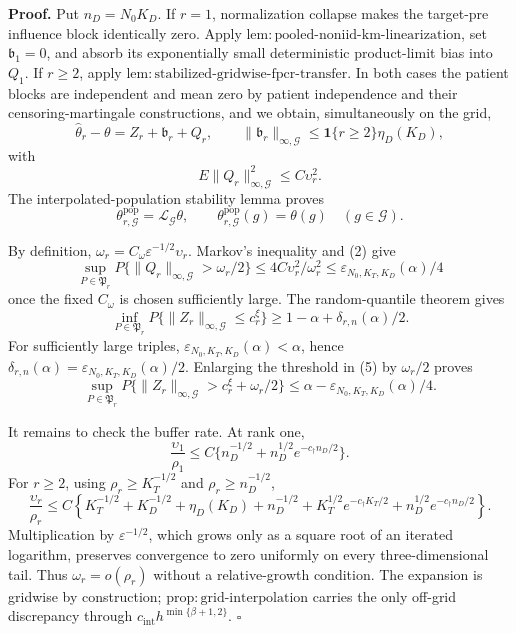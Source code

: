 \textbf{Proof.}
Put \(n_D=N_0K_D\).  If \(r=1\), normalization collapse makes the target-pre influence block identically zero.  Apply \(\mathrm{lem:pooled\mbox{-}noniid\mbox{-}km\mbox{-}linearization}\), set \(\mathfrak b_1=0\), and absorb its exponentially small deterministic product-limit bias into \(Q_1\).  If \(r\ge2\), apply \(\mathrm{lem:stabilized\mbox{-}gridwise\mbox{-}fpcr\mbox{-}transfer}\).  In both cases the patient blocks are independent and mean zero by patient independence and their censoring-martingale constructions, and we obtain, simultaneously on the grid,
\[
 \widehat\theta_r-\theta=Z_r+\mathfrak b_r+Q_r,
 \qquad
 \|\mathfrak b_r\|_{\infty,\mathcal G}
 \le\mathbf1\{r\ge2\}\eta_D(K_D),                     \tag{1}
\]
with
\[
 E\|Q_r\|_{\infty,\mathcal G}^2\le C\upsilon_r^2.      \tag{2}
\]
The interpolated-population stability lemma proves
\[
 \theta^{\mathrm{pop}}_{r,\mathcal G}
 =\mathcal L_{\mathcal G}\theta,
 \qquad
 \theta^{\mathrm{pop}}_{r,\mathcal G}(g)=\theta(g)
 \quad(g\in\mathcal G).                                \tag{3}
\]

By definition, \(\omega_r=C_\omega\varepsilon^{-1/2}\upsilon_r\).  Markov's inequality and (2) give
\[
 \sup_{P\in\mathfrak P_r}P\{\|Q_r\|_{\infty,\mathcal G}>\omega_r/2\}
 \le4C\upsilon_r^2/\omega_r^2
 \le\varepsilon_{N_0,K_T,K_D}(\alpha)/4                \tag{4}
\]
once the fixed \(C_\omega\) is chosen sufficiently large.  The random-quantile theorem gives
\[
 \inf_{P\in\mathfrak P_r}P\{\|Z_r\|_{\infty,\mathcal G}\le c_r^\xi\}
 \ge1-\alpha+\delta_{r,n}(\alpha)/2.                   \tag{5}
\]
For sufficiently large triples, \(\varepsilon_{N_0,K_T,K_D}(\alpha)<\alpha\), hence \(\delta_{r,n}(\alpha)=\varepsilon_{N_0,K_T,K_D}(\alpha)/2\).  Enlarging the threshold in (5) by \(\omega_r/2\) proves
\[
 \sup_{P\in\mathfrak P_r}P\{\|Z_r\|_{\infty,\mathcal G}>c_r^\xi+\omega_r/2\}
 \le\alpha-\varepsilon_{N_0,K_T,K_D}(\alpha)/4.         \tag{6}
\]

It remains to check the buffer rate.  At rank one,
\[
 \frac{\upsilon_1}{\rho_1}
 \le C\{n_D^{-1/2}+n_D^{1/2}e^{-c_\dagger n_D/2}\}.   \tag{7}
\]
For \(r\ge2\), using \(\rho_r\ge K_T^{-1/2}\) and \(\rho_r\ge n_D^{-1/2}\),
\[
 \frac{\upsilon_r}{\rho_r}
 \le C\left\{K_T^{-1/2}+K_D^{-1/2}+\eta_D(K_D)
 +n_D^{-1/2}+K_T^{1/2}e^{-c_\dagger K_T/2}
 +n_D^{1/2}e^{-c_\dagger n_D/2}\right\}.               \tag{8}
\]
Multiplication by \(\varepsilon^{-1/2}\), which grows only as a square root of an iterated logarithm, preserves convergence to zero uniformly on every three-dimensional tail.  Thus \(\omega_r=o(\rho_r)\) without a relative-growth condition.  The expansion is gridwise by construction; \(\mathrm{prop:grid\mbox{-}interpolation}\) carries the only off-grid discrepancy through \(c_{\mathrm{int}}h^{\min\{\beta+1,2\}}\). \(\square\)